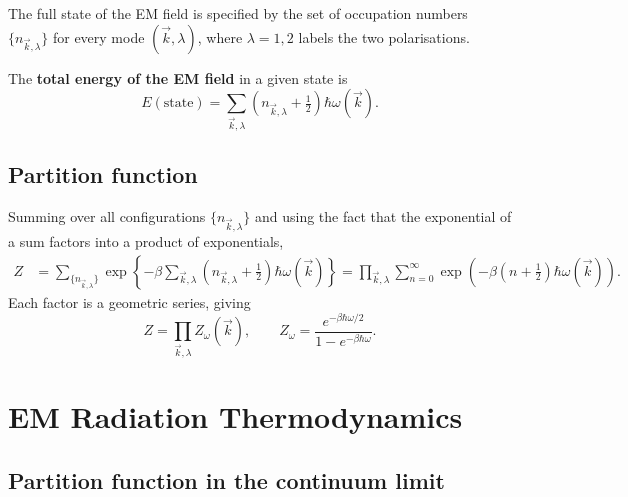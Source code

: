 The full state of the EM field is specified by the set of occupation numbers
$\{n_{\vec{k},\lambda}\}$ for every mode $(\vec{k},\lambda)$, where $\lambda=1,2$
labels the two polarisations.

\begin{definition}
The \textbf{total energy of the EM field} in a given state is
\begin{equation}
    E(\text{state}) = \sum_{\vec{k},\lambda}
    \left(n_{\vec{k},\lambda}+\tfrac{1}{2}\right)\hbar\omega(\vec{k}).
\end{equation}
\end{definition}

\subsection{Partition function}

Summing over all configurations $\{n_{\vec{k},\lambda}\}$ and using the fact that
the exponential of a sum factors into a product of exponentials,
\begin{align}
    Z &= \sum_{\{n_{\vec{k},\lambda}\}}
    \exp\!\left\{-\beta\sum_{\vec{k},\lambda}
    \left(n_{\vec{k},\lambda}+\tfrac{1}{2}\right)\hbar\omega(\vec{k})\right\}
    = \prod_{\vec{k},\lambda}\sum_{n=0}^{\infty}
    \exp\!\left(-\beta\!\left(n+\tfrac{1}{2}\right)\hbar\omega(\vec{k})\right).
\end{align}
Each factor is a geometric series, giving
\begin{equation}
    Z = \prod_{\vec{k},\lambda} Z_\omega(\vec{k}),\qquad
    Z_\omega = \frac{e^{-\beta\hbar\omega/2}}{1-e^{-\beta\hbar\omega}}.
\end{equation}

\section{EM Radiation Thermodynamics}

\subsection{Partition function in the continuum limit}

